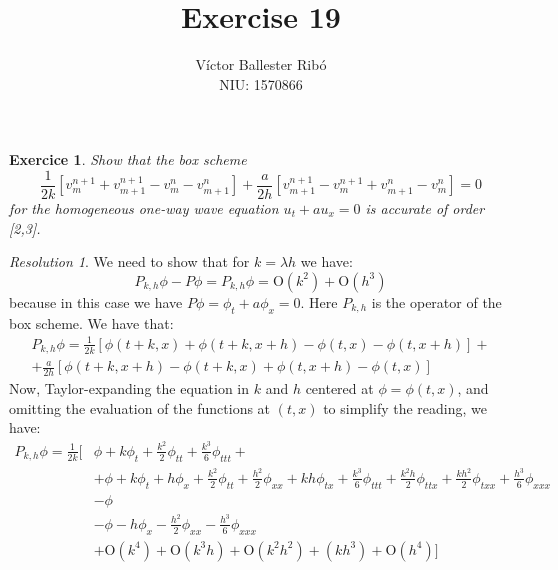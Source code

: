 \documentclass[10pt,a4paper]{article}
\title{\bfseries\Large Exercise 19}
\author{Víctor Ballester Ribó\\NIU: 1570866}
\date{\parbox{\linewidth}{\centering
  Integració numèrica d'equacions en derivades parcials\endgraf
  Grau en Matemàtiques\endgraf
  Universitat Autònoma de Barcelona\endgraf
  Febrer de 2023}}
\renewcommand{\O}{\mathrm{O}} %
\newtheorem{exercici}{Exercice}
\theoremstyle{definition}
\theoremstyle{remark}
\newtheorem*{res}{Resolution}
\begin{document}
\maketitle
\begin{exercici}
  Show that the box scheme
  $$
    \frac{1}{2k}\left[v_m^{n+1}+v_{m+1}^{n+1}-v_m^n-v_{m+1}^n\right] +\frac{a}{2h}\left[v_{m+1}^{n+1}-v_m^{n+1}+v_{m+1}^n-v_m^n\right]=0
  $$
  for the homogeneous one-way wave equation $u_t+au_x=0$ is accurate of order [2,3].
\end{exercici}
\begin{res}
  We need to show that for $k=\lambda h$ we have:
  $$
    P_{k,h}\phi-P\phi=P_{k,h}\phi=\O(k^2)+\O(h^3)
  $$
  because in this case we have $P\phi=\phi_t+a\phi_x=0$. Here $P_{k,h}$ is the operator of the box scheme. We have that:
  \begin{multline*}
    P_{k,h}\phi=\frac{1}{2k}\left[\phi(t+k,x)+\phi(t+k,x+h) - \phi(t,x)-\phi(t,x+h)\right] +\\+\frac{a}{2h}\left[\phi(t+k,x+h)-\phi(t+k,x)+\phi(t,x+h)-\phi(t,x)\right]
  \end{multline*}
  Now, Taylor-expanding the equation in $k$ and $h$ centered at $\phi=\phi(t,x)$, and omitting the evaluation of the functions at $(t,x)$ to simplify the reading, we have:
  \begin{align*}
    P_{k,h}\phi=\frac{1}{2k}\bigg[ & \phi+ k\phi_t + \frac{k^2}{2}\phi_{tt}+\frac{k^3}{6}\phi_{ttt}+                                                                                                                              \\
                                   & + \phi +k\phi_t + h\phi_x + \frac{k^2}{2}\phi_{tt} + \frac{h^2}{2}\phi_{xx} + kh\phi_{tx} +\frac{k^3}{6}\phi_{ttt}+\frac{k^2h}{2}\phi_{ttx}+\frac{kh^2}{2}\phi_{txx}+\frac{h^3}{6}\phi_{xxx} \\
                                   & -\phi                                                                                                                                                                                        \\
                                   & -\phi-h\phi_x-\frac{h^2}{2}\phi_{xx}-\frac{h^3}{6}\phi_{xxx}                                                                                                                                 \\
                                   & +\O(k^4)+\O(k^3h)+\O(k^2h^2)+(kh^3)+\O(h^4)\bigg]                                                                                                                                            \\

\end{align*}
\end{res}
\end{document}
